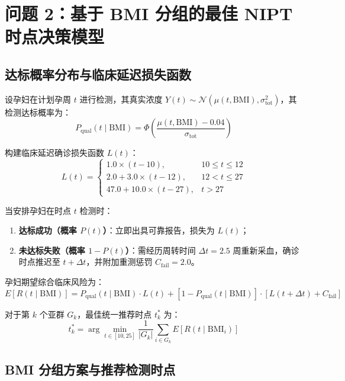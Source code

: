 \documentclass[11pt,a4paper]{article}
\begin{document}
\section{问题 2：基于 BMI 分组的最佳 NIPT 时点决策模型}

\subsection{达标概率分布与临床延迟损失函数}
设孕妇在计划孕周 $t$ 进行检测，其真实浓度 $Y(t) \sim \mathcal{N}(\mu(t, \text{BMI}), \sigma_{\text{tot}}^2)$，其检测达标概率为：
$$P_{\text{qual}}(t \mid \text{BMI}) = \Phi\left( \frac{\mu(t, \text{BMI}) - 0.04}{\sigma_{\text{tot}}} \right)$$

构建临床延迟确诊损失函数 $L(t)$：
$$L(t) = \begin{cases} 
1.0 \times (t - 10), & 10 \le t \le 12 \\
2.0 + 3.0 \times (t - 12), & 12 < t \le 27 \\
47.0 + 10.0 \times (t - 27), & t > 27 
\end{cases}$$

当安排孕妇在时点 $t$ 检测时：
\begin{enumerate}[leftmargin=*]
    \item \textbf{达标成功（概率 $P(t)$）}：立即出具可靠报告，损失为 $L(t)$；
    \item \textbf{未达标失败（概率 $1 - P(t)$）}：需经历周转时间 $\Delta t = 2.5$ 周重新采血，确诊时点推迟至 $t + \Delta t$，并附加重测惩罚 $C_{\text{fail}} = 2.0$。
\end{enumerate}

孕妇期望综合临床风险为：
$$E[R(t \mid \text{BMI})] = P_{\text{qual}}(t \mid \text{BMI}) \cdot L(t) + [1 - P_{\text{qual}}(t \mid \text{BMI})] \cdot [ L(t + \Delta t) + C_{\text{fail}} ]$$

对于第 $k$ 个亚群 $G_k$，最佳统一推荐时点 $t_k^*$ 为：
$$t_k^* = \arg\min_{t \in [10, 25]} \frac{1}{|G_k|} \sum_{i \in G_k} E[R(t \mid \text{BMI}_i)]$$

\subsection{BMI 分组方案与推荐检测时点}
\end{document}
